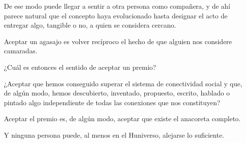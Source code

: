 \documentclass[12pt]{article}
\begin{document}
De ese modo puede llegar a sentir a otra persona como compañera, y de ahí parece natural que el concepto haya evolucionado hasta designar el acto de entregar algo, tangible o no, a quien se considera cercano.

Aceptar un agasajo es volver recíproco el hecho de que alguien nos considere camaradas.

¿Cuál es entonces el sentido de aceptar un premio?

¿Aceptar que hemos conseguido superar el sistema de conectividad social y que, de algún modo, hemos descubierto, inventado, propuesto, escrito, hablado o pintado algo independiente de todas las conexiones que nos constituyen?

Aceptar el premio es, de algún modo, aceptar que existe el anacoreta completo.

Y ninguna persona puede, al menos en el Huniverso, alejarse lo suficiente.
\end{document}
